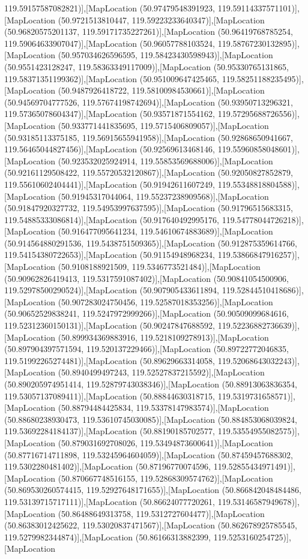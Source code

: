 119.59157587082821)],[MapLocation (50.97479548391923, 119.59114337571101)],[MapLocation (50.9721513810447, 119.59223233640347)],[MapLocation (50.96820575201137, 119.59171735227261)],[MapLocation (50.96419768785254, 119.59064633907047)],[MapLocation (50.96057788103524, 119.58767230132895)],[MapLocation (50.957034626596595, 119.58423430598943)],[MapLocation (50.9551423128247, 119.58363349117009)],[MapLocation (50.95330765131865, 119.58371351199362)],[MapLocation (50.951009647425465, 119.58251188235495)],[MapLocation (50.9487926418722, 119.58100984530661)],[MapLocation (50.94569704777526, 119.57674198742694)],[MapLocation (50.93950713296321, 119.57365078604347)],[MapLocation (50.93571871554162, 119.57295688726556)],[MapLocation (50.933771441835695, 119.5715406809057)],[MapLocation (50.93185113375185, 119.56915655941958)],[MapLocation (50.92868650941667, 119.56465044827456)],[MapLocation (50.92569613468146, 119.55960858048601)],[MapLocation (50.923532025924914, 119.55853569688006)],[MapLocation (50.92161129508422, 119.55720532120867)],[MapLocation (50.92050827852879, 119.55610602404441)],[MapLocation (50.91942611607249, 119.55348818804588)],[MapLocation (50.91945317044064, 119.55237238909568)],[MapLocation (50.91847920327732, 119.54953997637595)],[MapLocation (50.91796515683315, 119.54885333086814)],[MapLocation (50.917640492995176, 119.54778044726218)],[MapLocation (50.916477095641234, 119.54610674883689)],[MapLocation (50.914564880291536, 119.5438751509365)],[MapLocation (50.912875359614766, 119.54154380722653)],[MapLocation (50.91154948968234, 119.53866847916257)],[MapLocation (50.9108188921509, 119.5346773521484)],[MapLocation (50.90962826419413, 119.5317591087402)],[MapLocation (50.90841054500906, 119.52978500290524)],[MapLocation (50.907905433611894, 119.52844510418686)],[MapLocation (50.907283024750456, 119.52587018353256)],[MapLocation (50.90652529838241, 119.5247972999266)],[MapLocation (50.90509099684616, 119.52312360150131)],[MapLocation (50.90247847688592, 119.52236882736639)],[MapLocation (50.899934369883916, 119.5218109278913)],[MapLocation (50.897904397571594, 119.520137229466)],[MapLocation (50.89722772046835, 119.51992265274481)],[MapLocation (50.89629663314058, 119.52068643032243)],[MapLocation (50.8940499497243, 119.52527837215592)],[MapLocation (50.890205974951414, 119.52879743038346)],[MapLocation (50.88913063836354, 119.53057137089411)],[MapLocation (50.88844630318715, 119.5319731658571)],[MapLocation (50.88794484425834, 119.53378147983574)],[MapLocation (50.88680238930473, 119.53610745030085)],[MapLocation (50.884853068039824, 119.53692284184137)],[MapLocation (50.88190185702577, 119.53554955082575)],[MapLocation (50.879031692708026, 119.53494873600641)],[MapLocation (50.87716714711898, 119.53245964604059)],[MapLocation (50.87459457688302, 119.5302280481402)],[MapLocation (50.87196770074596, 119.52855434971491)],[MapLocation (50.870667748516155, 119.52868309574762)],[MapLocation (50.869530260574415, 119.52927648171655)],[MapLocation (50.866842048484486, 119.53139715717111)],[MapLocation (50.86624077720261, 119.53146587949678)],[MapLocation (50.86488649313758, 119.5312727604477)],[MapLocation (50.86383012425622, 119.53020837471567)],[MapLocation (50.862678925785545, 119.5279982344874)],[MapLocation (50.86166313882399, 119.5253160254725)],[MapLocation 
